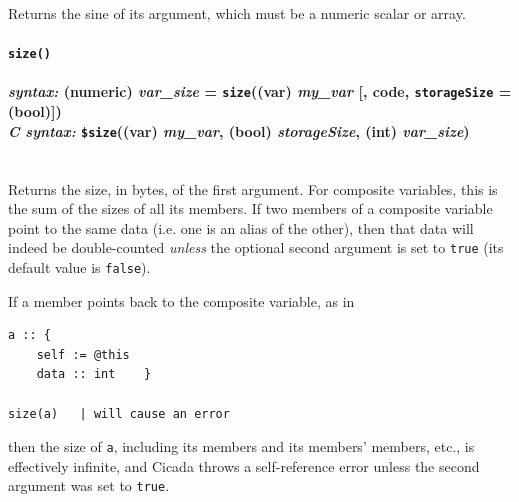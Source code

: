 \documentclass{article}
\newenvironment{code}{
       \begin{list}{}{
               \setlength{\leftmargin}{.4in}
               \setlength{\rightmargin}{0in}
               \setlength{\topsep}{.2in}
       }
       \small
       \item[] }
       { \end{list}   }
\begin{document}
Returns the sine of its argument, which must be a numeric scalar or array.\\







\paragraph{\texttt{size()}\\\\
\normalfont \emph{syntax: } (numeric) \emph{var\_size} = \texttt{size}((var) \emph{my\_var} [, code, \texttt{storageSize} = (bool)])\\
\normalfont \emph{C syntax: } \texttt{\$size}((var) \emph{my\_var}, (bool) \emph{storageSize}, (int) \emph{var\_size})\\\\}

Returns the size, in bytes, of the first argument.  For composite variables, this is the sum of the sizes of all its members.  If two members of a composite variable point to the same data (i.e. one is an alias of the other), then that data will indeed be double-counted \emph{unless} the optional second argument is set to \verb#true# (its default value is \verb#false#).

If a member points back to the composite variable, as in

\begin{code} \begin{verbatim}
a :: {
    self := @this
    data :: int    }

size(a)   | will cause an error
\end{verbatim} \end{code}

\noindent then the size of \texttt{a}, including its members and its members' members, etc., is effectively infinite, and Cicada throws a self-reference error unless the second argument was set to \verb#true#.\\




\end{document}
